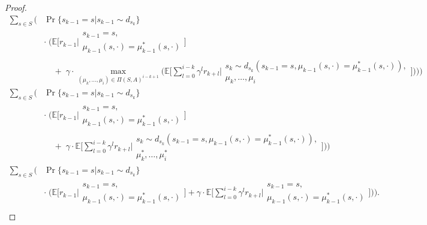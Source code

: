 \documentclass[11pt]{article} %
\begin{document}
\begin{proof}
\begin{equation}
	\begin{array}{rll}
		\sum\limits_{s \in S} \Big(	& \Pr\{ s_{k-1} = s | s_{k-1} \sim d_{s_k}\} \\
									& \cdot \; \Big( \mathbb{E} \Big[ r_{k-1} \Big| \begin{array}{c}
																						s_{k-1} = s, \\
																						\mu_{k-1}(s,\cdot) = \mu_{k-1}^*(s,\cdot)
																					\end{array} \Big] \\
									& \; \; \; \; + \; \gamma \cdot \max\limits_{(\mu_k,\dots,\mu_i) \in \Pi(S,A)^{i-k+1}} \Big( \mathbb{E}\Big[ \sum\limits_{l=0}^{i-k} \gamma^l r_{k+l} \Big| \begin{array}{c}
																																																s_k \sim d_{s_k}(s_{k-1} = s,\mu_{k-1}(s,\cdot) = \mu_{k-1}^*(s,\cdot)), \\
																																																\mu_k,\dots,\mu_i
																																															\end{array} \Big] \Big) \Big) \Big) \\
		\sum\limits_{s \in S} \Big(	& \Pr\{ s_{k-1} = s | s_{k-1} \sim d_{s_k}\} \\
									& \cdot \; \Big( \mathbb{E} \Big[ r_{k-1} \Big| \begin{array}{c}
																						s_{k-1} = s, \\
																						\mu_{k-1}(s,\cdot) = \mu_{k-1}^*(s,\cdot)
																					\end{array} \Big] \\
									& \; \; \; \; + \; \gamma \cdot  \mathbb{E}\Big[ \sum\limits_{l=0}^{i-k} \gamma^l r_{k+l} \Big| \begin{array}{c}
																																		s_k \sim d_{s_k}(s_{k-1} = s,\mu_{k-1}(s,\cdot) = \mu_{k-1}^*(s,\cdot)), \\
																																		\mu_k^*,\dots,\mu_i^*
																																	\end{array} \Big] \Big) \Big) \\
		\sum\limits_{s \in S} \Big(	& \Pr\{ s_{k-1} = s | s_{k-1} \sim d_{s_k}\} \\
									& \cdot \; \Big( \mathbb{E} \Big[ r_{k-1} \Big| \begin{array}{c}
																						s_{k-1} = s, \\
																						\mu_{k-1}(s,\cdot) = \mu_{k-1}^*(s,\cdot)
																					\end{array} \Big] + \gamma \cdot  \mathbb{E}\Big[ \sum\limits_{l=0}^{i-k} \gamma^l r_{k+l} \Big| \begin{array}{c}
																						s_{k-1} = s, \\
																						\mu_{k-1}(s,\cdot) = \mu_{k-1}^*(s,\cdot)
																					\end{array} \Big] \Big) \Big). \\	
		

\end{array}
\end{equation}
\end{proof}
\end{document}
